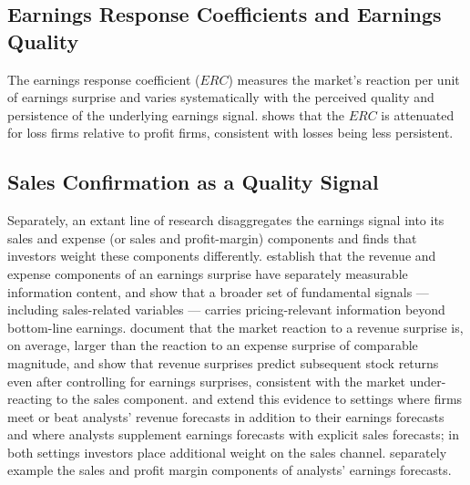 \documentclass[english,12pt]{article}
\begin{document}
\subsection{Earnings Response Coefficients and Earnings Quality}\label{sec:erc-quality}

The earnings response coefficient ($ERC$) measures the market's reaction per unit of earnings surprise and varies systematically with the perceived quality and persistence of the underlying earnings signal. \citet{hayn1995information} shows that the $ERC$ is attenuated for loss firms relative to profit firms, consistent with losses being less persistent. 

\subsection{Sales Confirmation as a Quality Signal}\label{sec:sales-confirmation}

Separately, an extant line of research disaggregates the earnings signal into its sales and expense (or sales and profit-margin) components and finds that investors weight these components differently. \citet{swaminathan1991information} establish that the revenue and expense components of an earnings surprise have separately measurable information content, and \citet{lev1993fundamental} show that a broader set of fundamental signals --- including sales-related variables --- carries pricing-relevant information beyond bottom-line earnings. \citet{ertimur2003differential} document that the market reaction to a revenue surprise is, on average, larger than the reaction to an expense surprise of comparable magnitude, and \citet{jegadeesh2006revenue} show that revenue surprises predict subsequent stock returns even after controlling for earnings surprises, consistent with the market under-reacting to the sales component. \citet{rees2007effect} and \citet{keung2010supplementary} extend this evidence to settings where firms meet or beat analysts' revenue forecasts in addition to their earnings forecasts and where analysts supplement earnings forecasts with explicit sales forecasts; in both settings investors place additional weight on the sales channel. \citet{cheng2020analyst} separately example the sales and profit margin components of analysts' earnings forecasts.
\end{document}
